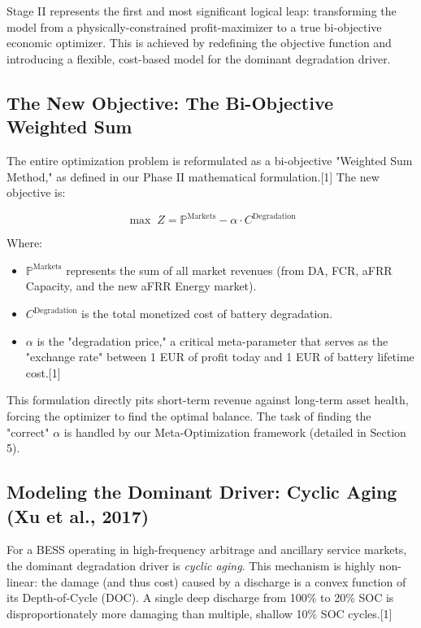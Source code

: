 \documentclass[11pt, a4paper]{article}
\begin{document}
Stage II represents the first and most significant logical leap: transforming the model from a physically-constrained profit-maximizer to a true bi-objective economic optimizer. This is achieved by redefining the objective function and introducing a flexible, cost-based model for the dominant degradation driver.

\subsection{The New Objective: The Bi-Objective Weighted Sum}

The entire optimization problem is reformulated as a bi-objective "Weighted Sum Method," as defined in our Phase II mathematical formulation.[1] The new objective is:

\begin{equation}
\max \; Z = \mathbb{P}^{\mathrm{Markets}} - \alpha \cdot C^{\mathrm{Degradation}}
\end{equation}

Where:
\begin{itemize}
    \item $\mathbb{P}^{\mathrm{Markets}}$ represents the sum of all market revenues (from DA, FCR, aFRR Capacity, and the new aFRR Energy market).
    \item $C^{\mathrm{Degradation}}$ is the total monetized cost of battery degradation.
    \item $\alpha$ is the "degradation price," a critical meta-parameter that serves as the "exchange rate" between 1 EUR of profit today and 1 EUR of battery lifetime cost.[1]
\end{itemize}

This formulation directly pits short-term revenue against long-term asset health, forcing the optimizer to find the optimal balance. The task of finding the "correct" $\alpha$ is handled by our Meta-Optimization framework (detailed in Section 5).

\subsection{Modeling the Dominant Driver: Cyclic Aging (Xu et al., 2017)}

For a BESS operating in high-frequency arbitrage and ancillary service markets, the dominant degradation driver is \textit{cyclic aging}. This mechanism is highly non-linear: the damage (and thus cost) caused by a discharge is a convex function of its Depth-of-Cycle (DOC). A single deep discharge from 100\% to 20\% SOC is disproportionately more damaging than multiple, shallow 10\% SOC cycles.[1]
\end{document}
